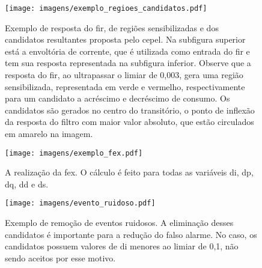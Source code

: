 \FloatBarrier

\begin{figure*}[p!]
  \begin{center}
    \begin{subfigure}[c]{\textwidth}
      \texttt{[image: imagens/exemplo\_regioes\_candidatos.pdf]}
      \caption{Exemplo de resposta do \acs{fir}, de regiões sensibilizadas e dos candidatos
resultantes proposta pelo \acs{cepel}. Na subfigura superior está a
envoltória de corrente, que é utilizada como entrada do \acs{fir} e
tem sua resposta representada na subfigura inferior. Observe que a
resposta do \acs{fir}, ao ultrapassar o limiar de 0,003, gera uma região
sensibilizada, representada em verde e vermelho, respectivamente para
um candidato a acréscimo e decréscimo de consumo. Os candidatos são
gerados no centro do transitório, o ponto de inflexão da resposta do
filtro com maior valor absoluto, que estão circulados em amarelo na
imagem.}
      \label{fig:resp_fir}
    \end{subfigure}
    \hfill
    \begin{subfigure}[c]{\textwidth}
      \texttt{[image: imagens/exemplo\_fex.pdf]}
      \caption{A realização da \acs{fex}. O cálculo é feito para todas as
variáveis \acs{di}, \acs{dp}, \acs{dq}, \acs{dd} e \acs{ds}.}
      \label{fig:cepel_fex}
    \end{subfigure}
    \hfill
  \end{center}
\end{figure*}

\begin{figure*}[p!]
  \begin{center}
    \ContinuedFloat
    \begin{subfigure}[c]{\textwidth}
      \texttt{[image: imagens/evento\_ruidoso.pdf]}
      \caption{Exemplo de remoção de eventos ruidosos. A eliminação
desses candidatos é importante para a redução do falso alarme. No
caso, os candidatos possuem valores de \acs{di} menores ao limiar de
0,1, não sendo aceitos por esse motivo.}
      \label{fig:ex_ruidoso}
    \end{subfigure}
  \end{center}
\caption[Gráficos descrevendo a operação da metodologia proposta pelo
\acs{cepel}.]{Gráficos descrevendo a operação da metodologia proposta
pelo \acs{cepel}. Os gráficos foram gerados utilizando o ambiente de
análise implementado por este trabalho descrito no
Capítulo~\ref{chap:framework}.}
\label{fig:cepel_metodologia_operacao}
\end{figure*}

